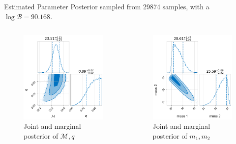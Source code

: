 \documentclass[
10pt,
aspectratio=169,
]{beamer}
\begin{document}
\begin{frame}{Estimated Parameter}
Posterior sampled from 29874 samples, with a $\log\mathcal{B}=90.168$.
    \begin{columns}
        \begin{figure}
            \centering
            \includegraphics[width=0.8\columnwidth]{param_final.png}
            \caption{Joint and marginal posterior of $\mathcal{M},q$}
        \end{figure}
        \begin{figure}
            \centering
            \includegraphics[width=0.8\columnwidth]{param_mass_final.png}
            \caption{Joint and marginal posterior of $m_1,m_2$}
        \end{figure}
    \end{columns}
\end{frame}
\end{document}
